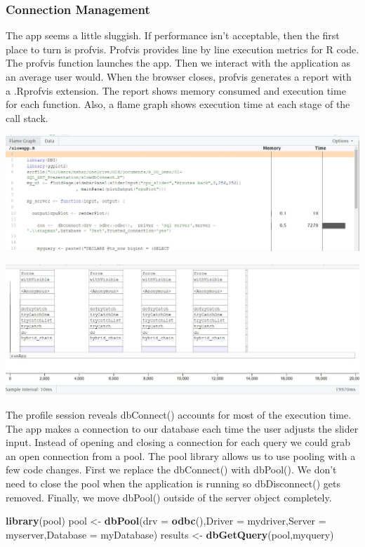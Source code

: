 \documentclass[]{article}
\newenvironment{Shaded}{\begin{snugshade}}{\end{snugshade}}
\newcommand{\DataTypeTok}[1]{\textcolor[rgb]{0.13,0.29,0.53}{#1}}
\newcommand{\KeywordTok}[1]{\textcolor[rgb]{0.13,0.29,0.53}{\textbf{#1}}}
\newcommand{\NormalTok}[1]{#1}
\newcommand{\StringTok}[1]{\textcolor[rgb]{0.31,0.60,0.02}{#1}}
\begin{document}
\hypertarget{connection-management}{%
\subsubsection{Connection Management}\label{connection-management}}

The app seems a little sluggish. If performance isn't acceptable, then
the first place to turn is profvis. Profvis provides line by line
execution metrics for R code. The profvis function launches the app.
Then we interact with the application as an average user would. When the
browser closes, profvis generates a report with a .Rprofvis extension.
The report shows memory consumed and execution time for each function.
Also, a flame graph shows execution time at each stage of the call
stack.

\includegraphics{./Images/ProfvisData.JPG}

\includegraphics{./Images/Flame.JPG}

The profile session reveals dbConnect() accounts for most of the
execution time. The app makes a connection to our database each time the
user adjusts the slider input. Instead of opening and closing a
connection for each query we could grab an open connection from a pool.
The pool library allows us to use pooling with a few code changes. First
we replace the dbConnect() with dbPool(). We don't need to close the
pool when the application is running so dbDisconnect() gets removed.
Finally, we move dbPool() outside of the server object completely.

\begin{Shaded}
\begin{Highlighting}[]
\KeywordTok{library}\NormalTok{(pool)}
\NormalTok{pool <-}\StringTok{ }\KeywordTok{dbPool}\NormalTok{(}\DataTypeTok{drv =} \KeywordTok{odbc}\NormalTok{(),}\DataTypeTok{Driver =}\NormalTok{ mydriver,}\DataTypeTok{Server =}\NormalTok{ myserver,}\DataTypeTok{Database =}\NormalTok{ myDatabase)}
\NormalTok{  results <-}\StringTok{ }\KeywordTok{dbGetQuery}\NormalTok{(pool,myquery)}
\end{Highlighting}
\end{Shaded}
\end{document}
